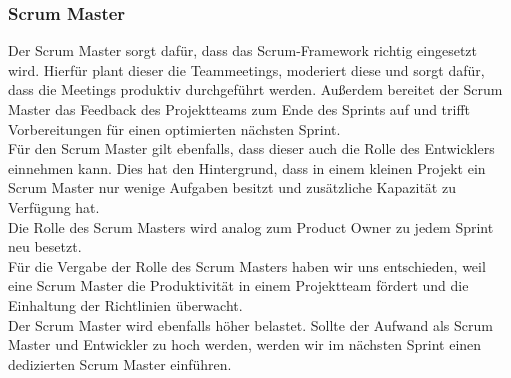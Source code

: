 \documentclass{article}
\begin{document}
\subsubsection{Scrum Master}
Der Scrum Master sorgt dafür, dass das Scrum-Framework richtig eingesetzt wird.
Hierfür plant dieser die Teammeetings, moderiert diese und sorgt dafür, dass die Meetings produktiv durchgeführt werden.
Außerdem bereitet der Scrum Master das Feedback des Projektteams zum Ende des Sprints auf und trifft Vorbereitungen für einen optimierten nächsten Sprint.\\
Für den Scrum Master gilt ebenfalls, dass dieser auch die Rolle des Entwicklers einnehmen kann.
Dies hat den Hintergrund, dass in einem kleinen Projekt ein Scrum Master nur wenige Aufgaben besitzt und zusätzliche Kapazität zu Verfügung hat.\\
Die Rolle des Scrum Masters wird analog zum Product Owner zu jedem Sprint neu besetzt.\\
Für die Vergabe der Rolle des Scrum Masters haben wir uns entschieden, weil eine Scrum Master die Produktivität in einem Projektteam fördert und die Einhaltung der Richtlinien überwacht.\\
Der Scrum Master wird ebenfalls höher belastet.
Sollte der Aufwand als Scrum Master und Entwickler zu hoch werden, werden wir im nächsten Sprint einen dedizierten Scrum Master einführen.
\end{document}
